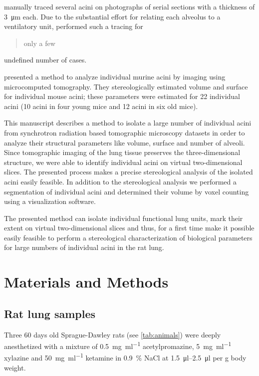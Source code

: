 \documentclass[a4paper,DIV=calc,abstract,english]{scrartcl}
\begin{document}
\citet{Mercer1987a} manually traced several acini on photographs of serial sections with a thickness of \SI{3}{\micro\meter} each.
Due to the substantial effort for relating each alveolus to a ventilatory unit, \citeauthor{Mercer1987a} performed such a tracing for \blockquote{only a few} undefined number of cases.

\citet{Vasilescu2012} presented a method to analyze individual murine acini by imaging using microcomputed tomography.
They stereologically estimated volume and surface for individual mouse acini; these parameters were estimated for 22 individual acini (10 acini in four young mice and 12 acini in six old mice).

This manuscript describes a method to isolate a large number of individual acini from synchrotron radiation based tomographic microscopy datasets in order to analyze their structural parameters like volume, surface and number of alveoli.
Since tomographic imaging of the lung tissue preserves the three-dimensional structure, we were able to identify individual acini on virtual two-dimensional slices.
The presented process makes a precise stereological analysis of the isolated acini easily feasible.
In addition to the stereological analysis we performed a segmentation of individual acini and determined their volume by voxel counting using a visualization software.

The presented method can isolate individual functional lung units, mark their extent on virtual two-dimensional slices and thus, for a first time make it possible easily feasible to perform a stereological characterization of biological parameters for large numbers of individual acini in the rat lung. 

\section{Materials and Methods}
\label{sec:materials and methods}
\subsection{Rat lung samples}
Three 60 days old Sprague-Dawley rats (see \autoref{tab:animals}) were deeply anesthetized with a mixture of %
\SI[per-mode=fraction]{0.5}{\milli\gram\per\milli\litre} acetylpromazine, %
\SI[per-mode=fraction]{5}{\milli\gram\per\milli\litre} xylazine and %
\SI[per-mode=fraction]{50}{\milli\gram\per\milli\litre} ketamine in %
\SI{0.9}{\percent} NaCl at \SIrange{1.5}{2.5}{\micro\litre} per \si{\gram} body weight.
\end{document}
